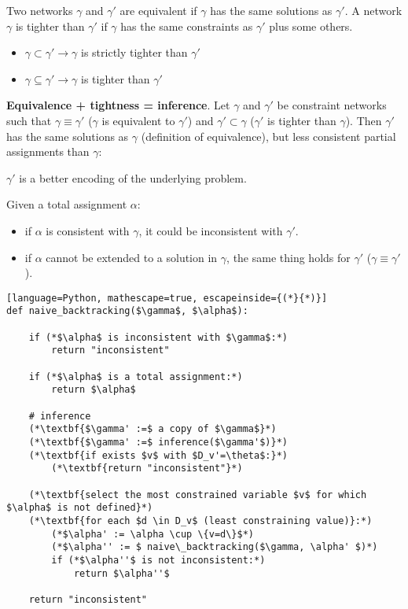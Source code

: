 \documentclass{article}
\begin{document}
Two networks $\gamma$ and $\gamma'$ are equivalent if $\gamma$ has the same solutions as $\gamma'$. A network $\gamma$ is tighter than $\gamma'$ if $\gamma$ has the same constraints as $\gamma'$ plus some others.

\begin{itemize}
    \item $\gamma \subset \gamma' \rightarrow \gamma$ is strictly tighter than $\gamma'$
    \item $\gamma \subseteq \gamma' \rightarrow \gamma$ is tighter than $\gamma'$
\end{itemize}

\textbf{Equivalence + tightness = inference}. Let $\gamma$ and $\gamma'$ be constraint networks such that $\gamma \equiv \gamma'$ ($\gamma$ is equivalent to $\gamma'$) and $\gamma' \subset \gamma$ ($\gamma'$ is tighter than $\gamma$). Then $\gamma'$ has the same solutions as $\gamma$ (definition of equivalence), but less consistent partial assignments than $\gamma$:
\begin{center}
    $\gamma'$ is a better encoding of the underlying problem.
\end{center}

Given a total assignment $\alpha$:
\begin{itemize}
    \item if $\alpha$ is consistent with $\gamma$, it could be inconsistent with $\gamma'$.
    \item if $\alpha$ cannot be extended to a solution in $\gamma$, the same thing holds for $\gamma'$ ($\gamma \equiv \gamma'$).
\end{itemize}

\newpage

\begin{lstlisting}[language=Python, mathescape=true, escapeinside={(*}{*)}]
def naive_backtracking($\gamma$, $\alpha$):

    if (*$\alpha$ is inconsistent with $\gamma$:*)
        return "inconsistent"

    if (*$\alpha$ is a total assignment:*)
        return $\alpha$

    # inference
    (*\textbf{$\gamma' :=$ a copy of $\gamma$}*)
    (*\textbf{$\gamma' :=$ inference($\gamma'$)}*)
    (*\textbf{if exists $v$ with $D_v'=\theta$:}*)
        (*\textbf{return "inconsistent"}*)

    (*\textbf{select the most constrained variable $v$ for which $\alpha$ is not defined}*)
    (*\textbf{for each $d \in D_v$ (least constraining value)}:*)
        (*$\alpha' := \alpha \cup \{v=d\}$*)
        (*$\alpha'' := $ naive\_backtracking($\gamma, \alpha' $)*)
        if (*$\alpha''$ is not inconsistent:*)
            return $\alpha''$

    return "inconsistent"
    
\end{lstlisting}
\end{document}
